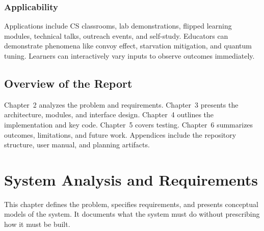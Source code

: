 \documentclass[12pt,a4paper,oneside]{report}
\begin{document}
\subsection{Applicability}
Applications include CS classrooms, lab demonstrations, flipped learning modules, technical talks, outreach events, and self-study. Educators can demonstrate phenomena like convoy effect, starvation mitigation, and quantum tuning. Learners can interactively vary inputs to observe outcomes immediately.

\section{Overview of the Report}
Chapter~2 analyzes the problem and requirements. Chapter~3 presents the architecture, modules, and interface design. Chapter~4 outlines the implementation and key code. Chapter~5 covers testing. Chapter~6 summarizes outcomes, limitations, and future work. Appendices include the repository structure, user manual, and planning artifacts.

\chapter{System Analysis and Requirements}
\noindent This chapter defines the problem, specifies requirements, and presents conceptual models of the system. It documents what the system must do without prescribing how it must be built.
\end{document}
